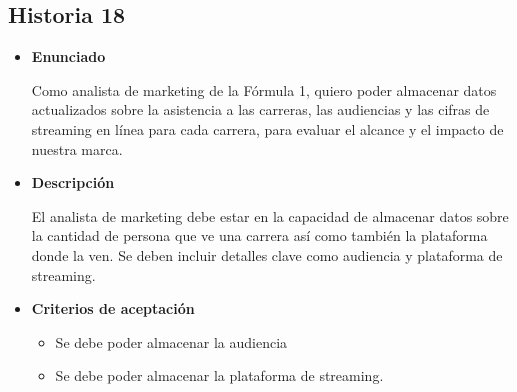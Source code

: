 \documentclass{article}
\begin{document}
	\subsection{Historia 18}
	\begin{itemize}
		
		\item \large{\textbf{Enunciado}}
		\begin{description}
			Como analista de marketing de la Fórmula 1, quiero poder almacenar datos actualizados sobre la asistencia a las carreras, las audiencias y las cifras de streaming en línea para cada carrera, para  evaluar el alcance y el impacto de nuestra marca.
			
		\end{description}
		
		\item \large{\textbf{Descripción}}
		\begin{description}
		El analista de marketing debe estar en la capacidad de almacenar datos sobre la cantidad de persona que ve una carrera así como también la plataforma donde la ven. Se deben incluir detalles clave como audiencia y plataforma de streaming.
		\end{description}
		
		\item \large{\textbf{Criterios de aceptación}}
		\begin{itemize}
			\item Se debe poder almacenar la audiencia
			\item Se debe poder almacenar la plataforma de streaming.
		\end{itemize}
		
	\end{itemize}
	
\end{document}
